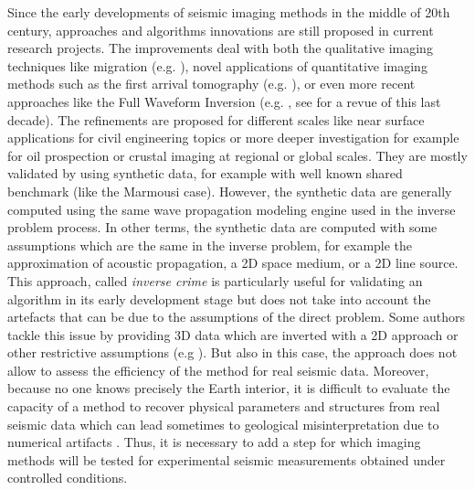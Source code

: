 \documentclass[manuscript,revised]{geophysics}
\begin{document}
\noindent Since the early developments of seismic imaging methods in the middle of 20th century, approaches and algorithms innovations are still proposed in current research projects. The improvements deal with both the qualitative imaging techniques like migration (e.g. \citet{Berkhout_MSS_2012,Guofeng_GPU_2013}), novel applications of quantitative imaging methods such as the first arrival tomography (e.g. \citet{Bohm_CWS_2015}), or even more recent approaches like the Full Waveform Inversion (e.g. \citet{Perez_AWI_2014}, see \citet{Virieux_FWI_2009} for a revue of this last decade). The refinements are proposed for different scales like near surface applications for civil engineering topics or more deeper investigation for example for oil prospection or crustal imaging at regional or global scales. They are mostly validated by using synthetic data, for example with well known shared benchmark (like the Marmousi case). However, the synthetic data are generally computed using the same wave propagation modeling engine used in the inverse problem process. In other terms, the synthetic data are computed with some assumptions which are the same in the inverse problem, for example the approximation of acoustic propagation, a 2D space medium, or a 2D line source. This approach, called \textit{inverse crime} \citep{Wirgin_TIC_2004} is particularly useful for validating an algorithm in its early development stage but does not take into account the artefacts that can be due to the assumptions of the direct problem. Some authors tackle this issue by providing 3D data which are inverted with a 2D approach or other restrictive assumptions (e.g ). But also in this case, the approach does not allow to assess the efficiency of the method for real seismic data. Moreover, because no one knows precisely the Earth interior, it is difficult to evaluate the capacity of a method to recover physical parameters and structures from real seismic data which can lead sometimes to geological misinterpretation due to numerical artifacts \citep{Morozov_ARF_2004}. Thus, it is necessary to add a step for which imaging methods will be tested for experimental seismic measurements obtained under controlled conditions.
\end{document}
